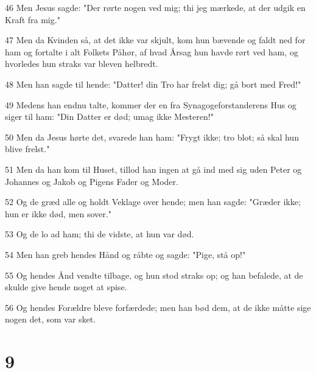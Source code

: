 \par 46 Men Jesus sagde: "Der rørte nogen ved mig; thi jeg mærkede, at der udgik en Kraft fra mig."
\par 47 Men da Kvinden så, at det ikke var skjult, kom hun bævende og faldt ned for ham og fortalte i alt Folkets Påhør, af hvad Årsag hun havde rørt ved ham, og hvorledes hun straks var bleven helbredt.
\par 48 Men han sagde til hende: "Datter! din Tro har frelst dig; gå bort med Fred!"
\par 49 Medens han endnu talte, kommer der en fra Synagogeforstanderens Hus og siger til ham: "Din Datter er død; umag ikke Mesteren!"
\par 50 Men da Jesus hørte det, svarede han ham: "Frygt ikke; tro blot; så skal hun blive frelst."
\par 51 Men da han kom til Huset, tillod han ingen at gå ind med sig uden Peter og Johannes og Jakob og Pigens Fader og Moder.
\par 52 Og de græd alle og holdt Veklage over hende; men han sagde: "Græder ikke; hun er ikke død, men sover."
\par 53 Og de lo ad ham; thi de vidste, at hun var død.
\par 54 Men han greb hendes Hånd og råbte og sagde: "Pige, stå op!"
\par 55 Og hendes Ånd vendte tilbage, og hun stod straks op; og han befalede, at de skulde give hende noget at spise.
\par 56 Og hendes Forældre bleve forfærdede; men han bød dem, at de ikke måtte sige nogen det, som var sket.

\chapter{9}

